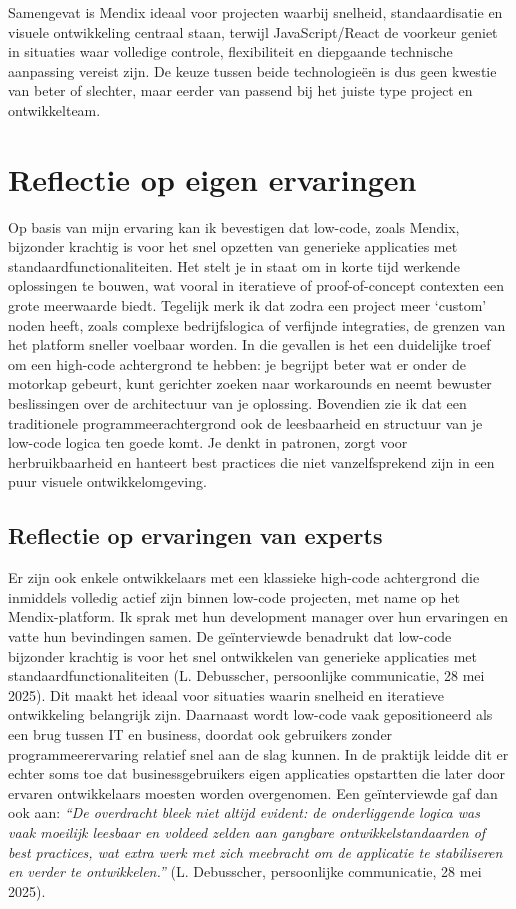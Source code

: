 Samengevat is Mendix ideaal voor projecten waarbij snelheid, standaardisatie en visuele ontwikkeling centraal staan, terwijl JavaScript/React de voorkeur geniet in situaties waar volledige controle, flexibiliteit en diepgaande technische aanpassing vereist zijn. De keuze tussen beide technologieën is dus geen kwestie van beter of slechter, maar eerder van passend bij het juiste type project en ontwikkelteam.


\section{Reflectie op eigen ervaringen}
Op basis van mijn ervaring kan ik bevestigen dat low-code, zoals Mendix, bijzonder krachtig is voor het snel opzetten van generieke applicaties met standaardfunctionaliteiten. Het stelt je in staat om in korte tijd werkende oplossingen te bouwen, wat vooral in iteratieve of proof-of-concept contexten een grote meerwaarde biedt. Tegelijk merk ik dat zodra een project meer ‘custom’ noden heeft, zoals complexe bedrijfslogica of verfijnde integraties, de grenzen van het platform sneller voelbaar worden. In die gevallen is het een duidelijke troef om een high-code achtergrond te hebben: je begrijpt beter wat er onder de motorkap gebeurt, kunt gerichter zoeken naar workarounds en neemt bewuster beslissingen over de architectuur van je oplossing. Bovendien zie ik dat een traditionele programmeerachtergrond ook de leesbaarheid en structuur van je low-code logica ten goede komt. Je denkt in patronen, zorgt voor herbruikbaarheid en hanteert best practices die niet vanzelfsprekend zijn in een puur visuele ontwikkelomgeving.

\subsection{Reflectie op ervaringen van experts}
Er zijn ook enkele ontwikkelaars met een klassieke high-code achtergrond die inmiddels volledig actief zijn binnen low-code projecten, met name op het Mendix-platform. Ik sprak met hun development manager over hun ervaringen en vatte hun bevindingen samen. 
De geïnterviewde benadrukt dat low-code bijzonder krachtig is voor het snel ontwikkelen van generieke applicaties met standaardfunctionaliteiten (L. Debusscher, persoonlijke communicatie, 28 mei 2025). Dit maakt het ideaal voor situaties waarin snelheid en iteratieve ontwikkeling belangrijk zijn. Daarnaast wordt low-code vaak gepositioneerd als een brug tussen IT en business, doordat ook gebruikers zonder programmeerervaring relatief snel aan de slag kunnen. In de praktijk leidde dit er echter soms toe dat businessgebruikers eigen applicaties opstartten die later door ervaren ontwikkelaars moesten worden overgenomen. Een geïnterviewde gaf dan ook aan: \textit{“De overdracht bleek niet altijd evident: de onderliggende logica was vaak moeilijk leesbaar en voldeed zelden aan gangbare ontwikkelstandaarden of best practices, wat extra werk met zich meebracht om de applicatie te stabiliseren en verder te ontwikkelen.”} (L. Debusscher, persoonlijke communicatie, 28 mei 2025). 

